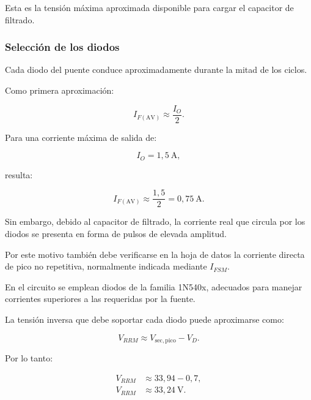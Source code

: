 \documentclass[12pt,a4paper]{article}
\begin{document}
	Esta es la tensión máxima aproximada disponible para cargar el capacitor de
	filtrado.
	
	\subsubsection{Selección de los diodos}
	
	Cada diodo del puente conduce aproximadamente durante la mitad de los ciclos.
	
	Como primera aproximación:
	
	\begin{equation}
		I_{F(\mathrm{AV})}
		\approx
		\frac{I_O}{2}.
	\end{equation}
	
	Para una corriente máxima de salida de:
	
	\begin{equation}
		I_O=1,5~\text{A},
	\end{equation}
	
	resulta:
	
	\begin{equation}
		I_{F(\mathrm{AV})}
		\approx
		\frac{1,5}{2}
		=
		0,75~\text{A}.
	\end{equation}
	
	Sin embargo, debido al capacitor de filtrado, la corriente real que circula por
	los diodos se presenta en forma de pulsos de elevada amplitud.
	
	Por este motivo también debe verificarse en la hoja de datos la corriente
	directa de pico no repetitiva, normalmente indicada mediante $I_{FSM}$.
	
	En el circuito se emplean diodos de la familia 1N540x, adecuados para manejar
	corrientes superiores a las requeridas por la fuente.
	
	La tensión inversa que debe soportar cada diodo puede aproximarse como:
	
	\begin{equation}
		V_{RRM}
		\approx
		V_{\mathrm{sec,pico}}-V_D.
	\end{equation}
	
	Por lo tanto:
	
	\begin{align}
		V_{RRM}
		&\approx
		33,94-0,7,
		\\
		V_{RRM}
		&\approx
		33,24~\text{V}.
	\end{align}
	
\end{document}
